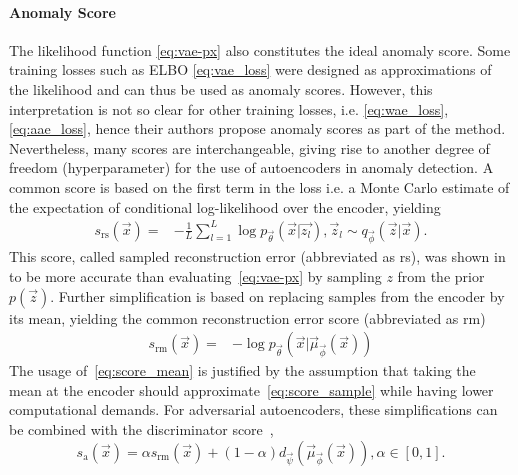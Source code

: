 \paragraph{Anomaly Score}
The likelihood function \eqref{eq:vae-px} also constitutes the ideal anomaly score. Some training losses such as ELBO \eqref{eq:vae_loss} were designed as approximations of the likelihood and can thus be used as anomaly scores. However, this interpretation is not so clear for other  training losses, i.e. \eqref{eq:wae_loss}, \eqref{eq:aae_loss}, hence their authors propose anomaly scores as part of the method. Nevertheless, many scores are interchangeable, giving rise to another degree of freedom (hyperparameter) for the use of autoencoders in anomaly detection. A common score is based on the first term in the loss i.e. a Monte Carlo estimate of the expectation of conditional log-likelihood over the encoder, yielding \begin{align}
s_{\text{rs}}(\vec{x}) = & - \frac{1}{L}\sum_{l=1}^L \log p_{\vec{\theta}}(\vec{x}| \vec{z_l}),   \vec{z}_l \sim q_{\vec{\phi}}(\vec{z}|\vec{x}). \label{eq:score_sample}
\end{align}
This score, called sampled reconstruction error (abbreviated as rs), was shown in~\cite{xu2018unsupervised} to be more accurate than evaluating~\eqref{eq:vae-px} by sampling $z$ from the prior $p(\vec{z})$. Further simplification is based on replacing samples from the encoder  by its mean, yielding the common reconstruction error score (abbreviated as rm)
\begin{align}
s_{\text{rm}}(\vec{x}) = & - \log p_{\vec{\theta}}(\vec{x}| \vec{\mu}_{\vec{\phi}}(\vec{x})) \label{eq:score_mean}
\end{align}
The usage of~\eqref{eq:score_mean} is justified by the assumption that taking the mean at the encoder should approximate~\eqref{eq:score_sample} while having lower computational demands. For adversarial autoencoders, these simplifications can be combined with the discriminator score~\cite{schlegl2017unsupervised, zenatiEfficientGANBasedAnomaly2018},
\begin{equation}
    s_{\text{a}}(\vec{x}) = \alpha s_{\text{rm}}(\vec{x}) + (1-\alpha) d_{\vec{\psi}}(\vec{\mu}_{\vec{\phi}}(\vec{x})), \alpha \in \left[ 0, 1 \right].
\label{eq:aae_score}
\end{equation}

